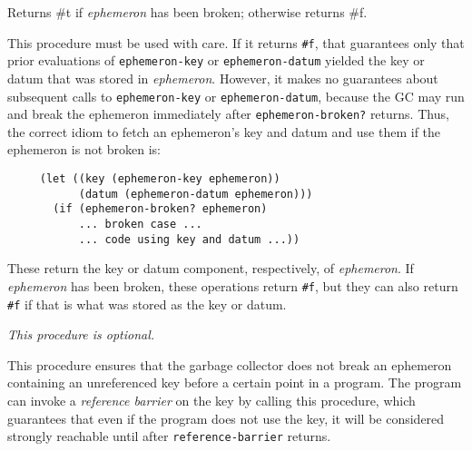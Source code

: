 \begin{entry}{%
  }

  Returns \#t if \emph{ephemeron} has been broken; otherwise returns
  \#f.

  This procedure must be used with care. If it returns \texttt{\#f},
  that guarantees only that prior evaluations of
  \texttt{ephemeron-key} or \texttt{ephemeron-datum} yielded the key
  or datum that was stored in \emph{ephemeron}. However, it makes no
  guarantees about subsequent calls to \texttt{ephemeron-key} or
  \texttt{ephemeron-datum}, because the GC may run and break the
  ephemeron immediately after \texttt{ephemeron-broken?}
  returns. Thus, the correct idiom to fetch an ephemeron's key and
  datum and use them if the ephemeron is not broken is:

\begin{verbatim}
     (let ((key (ephemeron-key ephemeron))
           (datum (ephemeron-datum ephemeron)))
       (if (ephemeron-broken? ephemeron)
           ... broken case ...
           ... code using key and datum ...))
\end{verbatim}
\end{entry}

\begin{entry}{%
  }

  These return the key or datum component, respectively, of
  \emph{ephemeron}. If \emph{ephemeron} has been broken, these
  operations return \texttt{\#f}, but they can also return
  \texttt{\#f} if that is what was stored as the key or datum.
\end{entry}

\begin{entry}{%
  }

  \emph{This procedure is optional.}

  This procedure ensures that the garbage collector does not break an
  ephemeron containing an unreferenced key before a certain point in a
  program. The program can invoke a \emph{reference barrier} on the
  key by calling this procedure, which guarantees that even if the
  program does not use the key, it will be considered strongly
  reachable until after \texttt{reference-barrier} returns.

\end{entry}

